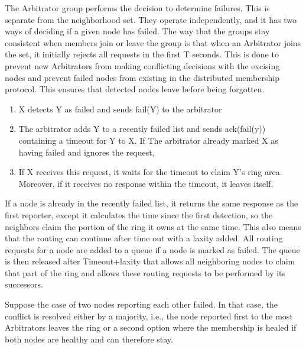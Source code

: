 \documentclass[a4paper,10pt,titlepage]{report}
\begin{document}
    The Arbitrator group performs the decision to determine failures. This is separate from the neighborhood set. They operate independently, and it has two ways of deciding if a given node has failed. The way that the groups stay consistent when members join or leave the group is that when an Arbitrator joins the set, it initially rejects all requests in the first T seconds. This is done to prevent new Arbitrators from making conflicting decisions with the excising nodes and prevent failed nodes from existing in the distributed membership protocol. This ensures that detected nodes leave before being forgotten.\\
    \vspace{5mm}

    \begin{enumerate}
        \item X detects Y as failed and sends fail(Y) to the arbitrator
        \item The arbitrator adds Y to a recently failed list and sends ack(fail(y)) containing a timeout for Y to X. If The arbitrator already marked X as having failed and ignores the request,
        \item If X receives this request, it waits for the timeout to claim Y's ring area. Moreover, if it receives no response within the timeout, it leaves itself.
    \end{enumerate}

    If a node is already in the recently failed list, it returns the same response as the first reporter, except it calculates the time since the first detection, so the neighbors claim the portion of the ring it owns at the same time. This also means that the routing can continue after time out with a laxity added. All routing requests for a node are added to a queue if a node is marked as failed. The queue is then released after Timeout+laxity that allows all neighboring nodes to claim that part of the ring and allows these routing requests to be performed by its successors.\\
    \vspace{5mm}

  Suppose the case of two nodes reporting each other failed. In that case, the conflict is resolved either by a majority, i.e., the node reported first to the most Arbitrators leaves the ring or a second option where the membership is healed if both nodes are healthy and can therefore stay. \\   \vspace{5mm}
    
\end{document}
